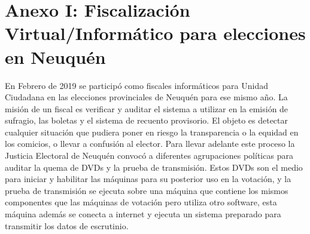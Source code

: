 \label{Anexos}
\appendix
\chapter{Anexo I: Fiscalización Virtual/Informático para elecciones en Neuquén}
En Febrero de 2019 se participó como fiscales informáticos para Unidad Ciudadana en las elecciones provinciales de Neuquén para ese mismo año. La misión de un fiscal es verificar y auditar el sistema a utilizar en la emisión de sufragio, las boletas y el sistema de recuento provisorio. El objeto es detectar cualquier situación que pudiera poner en riesgo la transparencia o la equidad en los comicios, o llevar a confusión al elector. Para llevar adelante este proceso la Justicia Electoral de Neuquén convocó a diferentes agrupaciones políticas para auditar la quema de DVDs y la prueba de transmisión. Estos DVDs son el medio para iniciar y habilitar las máquinas para su posterior uso en la votación, y la prueba de transmisión se ejecuta sobre una máquina que contiene los mismos componentes que las máquinas de votación pero utiliza otro software, esta máquina además se conecta a internet y ejecuta un sistema preparado para transmitir los datos de escrutinio. 

